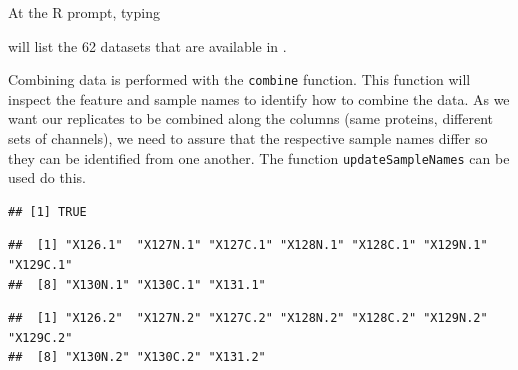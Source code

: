 At the R prompt, typing

\begin{knitrout}
\color{fgcolor}\begin{kframe}
\begin{alltt}
\hlstd{()}
\end{alltt}
\end{kframe}
\end{knitrout}

will list the 62 datasets that are
available in .


Combining data is performed with the \texttt{combine} function. This
function will inspect the feature and sample names to identify how to
combine the data. As we want our replicates to be combined along the
columns (same proteins, different sets of channels), we need to assure
that the respective sample names differ so they can be identified from
one another. The function \texttt{updateSampleNames} can be used do
this.

\begin{knitrout}
\color{fgcolor}\begin{kframe}
\begin{alltt}
\hlstd{(} 
\end{alltt}
\begin{verbatim}
## [1] TRUE
\end{verbatim}
\begin{alltt}
 \hlkwb{<-}  \hlstd{)}
 \hlkwb{<-}  \hlstd{)}
\end{alltt}
\begin{verbatim}
##  [1] "X126.1"  "X127N.1" "X127C.1" "X128N.1" "X128C.1" "X129N.1" "X129C.1"
##  [8] "X130N.1" "X130C.1" "X131.1"
\end{verbatim}
\begin{alltt}
\end{alltt}
\begin{verbatim}
##  [1] "X126.2"  "X127N.2" "X127C.2" "X128N.2" "X128C.2" "X129N.2" "X129C.2"
##  [8] "X130N.2" "X130C.2" "X131.2"
\end{verbatim}
\end{kframe}
\end{knitrout}


